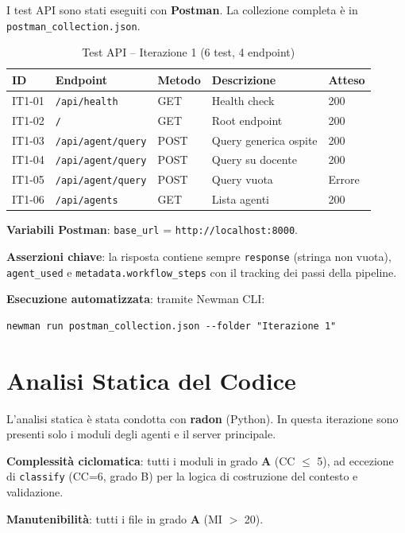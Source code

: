 \documentclass[a4paper,12pt]{report}
\begin{document}
I test API sono stati eseguiti con \textbf{Postman}. La collezione completa è in \texttt{postman\_collection.json}.

\begin{table}[H]
\centering
\small
\begin{tabularx}{\textwidth}{l l l X l}
\toprule
\textbf{ID} & \textbf{Endpoint} & \textbf{Metodo} & \textbf{Descrizione} & \textbf{Atteso} \\
\midrule
IT1-01 & \texttt{/api/health} & GET & Health check & 200 \\
IT1-02 & \texttt{/} & GET & Root endpoint & 200 \\
IT1-03 & \texttt{/api/agent/query} & POST & Query generica ospite & 200 \\
IT1-04 & \texttt{/api/agent/query} & POST & Query su docente & 200 \\
IT1-05 & \texttt{/api/agent/query} & POST & Query vuota & Errore \\
IT1-06 & \texttt{/api/agents} & GET & Lista agenti & 200 \\
\bottomrule
\end{tabularx}
\caption{Test API -- Iterazione 1 (6 test, 4 endpoint)}
\end{table}

\textbf{Variabili Postman}: \texttt{base\_url} = \texttt{http://localhost:8000}.

\textbf{Asserzioni chiave}: la risposta contiene sempre \texttt{response} (stringa non vuota), \texttt{agent\_used} e \texttt{metadata.workflow\_steps} con il tracking dei passi della pipeline.

\textbf{Esecuzione automatizzata}: tramite Newman CLI:
\begin{verbatim}
newman run postman_collection.json --folder "Iterazione 1"
\end{verbatim}

\section{Analisi Statica del Codice}

L'analisi statica è stata condotta con \textbf{radon} (Python). In questa iterazione sono presenti solo i moduli degli agenti e il server principale.

\textbf{Complessità ciclomatica}: tutti i moduli in grado \textbf{A} (CC $\leq$ 5), ad eccezione di \texttt{classify} (CC=6, grado B) per la logica di costruzione del contesto e validazione.

\textbf{Manutenibilità}: tutti i file in grado \textbf{A} (MI $>$ 20).
\end{document}
